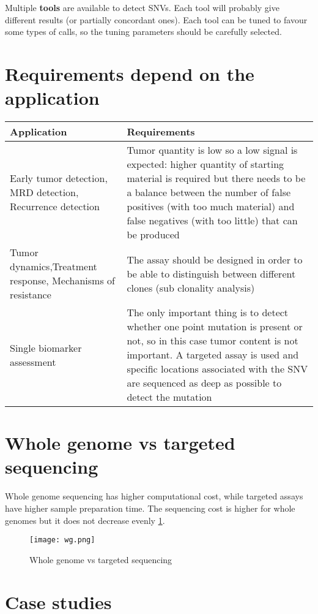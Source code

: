 Multiple \textbf{tools} are available to detect SNVs. Each tool will probably give different results (or partially concordant ones). Each tool can be tuned to favour some types of calls, so the tuning parameters should be carefully selected.

\section{Requirements depend on the application}

\begin{tabular}{ | p{6cm} | p{10cm} | }
 \hline
 \textbf{Application} & \textbf{Requirements} \\
 \hline
  Early tumor detection, MRD detection, Recurrence detection & Tumor quantity is low so a low signal is expected: higher quantity of starting material is required but there needs to be a 			balance between the number of false positives (with too much material) and false negatives (with too little) that can be produced \\
 \hline
	Tumor dynamics,Treatment response, Mechanisms of resistance & The assay should be designed in order to be able to distinguish between different clones (sub clonality analysis) \\
 \hline
 Single biomarker assessment & The only important thing is to detect whether one point mutation is present or not, so in this case tumor content is not important. A targeted assay is used and specific locations associated with the SNV are sequenced as deep as possible to detect the mutation \\
 \hline
\end{tabular}

\section{Whole genome vs targeted sequencing}
Whole genome sequencing has higher computational cost, while targeted assays have higher sample preparation time. The sequencing cost is higher for whole genomes but it does not decrease evenly \ref{fig:wg}.

\begin{figure}[H]
\centering
    \texttt{[image: wg.png]}
    \caption{\label{fig:wg}Whole genome vs targeted sequencing}
\end{figure}

\section{Case studies}
